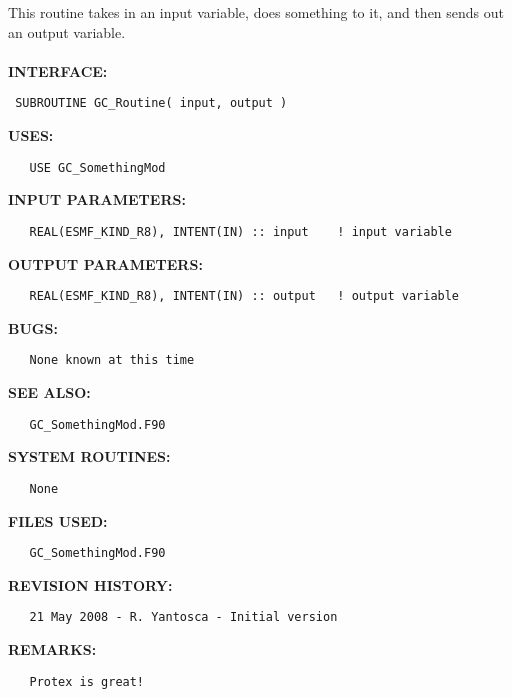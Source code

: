 \documentclass[11pt]{article}
\begin{document}
  This routine takes in an input variable, does something to it, 
    and then sends out an output variable.
  \\
  \\{\bf INTERFACE:}
\begin{verbatim} SUBROUTINE GC_Routine( input, output )\end{verbatim}{\bf USES:}
\begin{verbatim}   USE GC_SomethingMod\end{verbatim}{\bf INPUT PARAMETERS:}
\begin{verbatim}   REAL(ESMF_KIND_R8), INTENT(IN) :: input    ! input variable\end{verbatim}{\bf OUTPUT PARAMETERS:}
\begin{verbatim}   REAL(ESMF_KIND_R8), INTENT(IN) :: output   ! output variable\end{verbatim}{\bf BUGS:}
\begin{verbatim}   None known at this time\end{verbatim}{\bf SEE ALSO:}
\begin{verbatim}   GC_SomethingMod.F90\end{verbatim}{\bf SYSTEM ROUTINES:}
\begin{verbatim}   None\end{verbatim}{\bf FILES USED:}
\begin{verbatim}   GC_SomethingMod.F90\end{verbatim}{\bf REVISION HISTORY:}
\begin{verbatim}   21 May 2008 - R. Yantosca - Initial version\end{verbatim}{\bf REMARKS:}
\begin{verbatim}   Protex is great!
   \end{verbatim}

\end{document}
